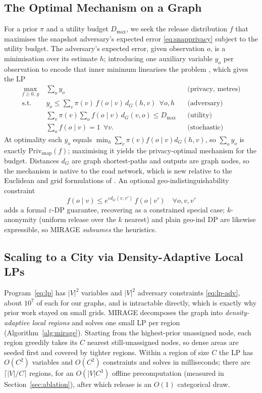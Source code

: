 \documentclass[10pt,journal,compsoc]{IEEEtran}
\newcommand{\dG}{d_{G}}
\begin{document}
\subsection{The Optimal Mechanism on a Graph}
For a prior $\pi$ and a utility budget $D_{\max}$, we seek the release distribution
$f$ that maximises the snapshot adversary's expected error \eqref{eq:snapprivacy}
subject to the utility budget. The adversary's expected error, given observation
$o$, is a minimisation over its estimate $h$; introducing one auxiliary variable
$y_o$ per observation to encode that inner minimum linearises the problem
\cite{shokri2012}, which gives the LP
\begin{subequations}\label{eq:lp}
\begin{align}
\max_{f\ge 0,\,y}\ & \sum_{o} y_o &&\text{(privacy, metres)}\\
\text{s.t. }\ & y_o \le \sum_{v}\pi(v)\,f(o\mid v)\,\dG(h,v)\ \ \forall o,h &&\text{(adversary)}\label{eq:lp-adv}\\
& \sum_{v}\pi(v)\sum_{o} f(o\mid v)\,\dG(v,o)\le D_{\max} &&\text{(utility)}\\
& \sum_{o} f(o\mid v)=1\ \ \forall v. &&\text{(stochastic)}
\end{align}
\end{subequations}
At optimality each $y_o$ equals $\min_h\sum_v \pi(v)f(o\mid v)\dG(h,v)$, so
$\sum_o y_o$ is exactly $\mathrm{Priv}_{\mathrm{snap}}(f)$; maximising it yields the
privacy-optimal mechanism for the budget. Distances $\dG$ are graph shortest-paths
and outputs are graph nodes, so the mechanism is native to the road network, which
is new relative to the Euclidean and grid formulations of
\cite{shokri2012,bordenabe2014}. An optional geo-indistinguishability constraint
\begin{equation}
f(o\mid v)\le e^{\varepsilon \dG(v,v')}\,f(o\mid v')\quad\forall o,v,v'
\label{eq:geoind}
\end{equation}
adds a formal $\varepsilon$-DP guarantee, recovering \cite{bordenabe2014} as a
constrained special case; $k$-anonymity (uniform release over the $k$ nearest) and
plain geo-ind DP are likewise expressible, so MIRAGE \emph{subsumes} the
heuristics.

\subsection{Scaling to a City via Density-Adaptive Local LPs}
Program~\eqref{eq:lp} has $|V|^2$ variables and $|V|^2$ adversary constraints
\eqref{eq:lp-adv}, about $10^7$ of each for our graphs, and is intractable
directly, which is exactly why prior work stayed on small grids. MIRAGE decomposes
the graph into \emph{density-adaptive local regions} and solves one small LP per
region (Algorithm~\ref{alg:mirage}). Starting from the highest-prior unassigned
node, each region greedily takes its $C$ nearest still-unassigned nodes, so dense
areas are seeded first and covered by tighter regions. Within a region of size $C$
the LP has $O(C^2)$ variables and $O(C^2)$ constraints and solves in milliseconds;
there are $\lceil|V|/C\rceil$ regions, for an $O(|V|C^3)$ offline precomputation
(measured in Section~\ref{sec:ablation}), after which release is an $O(1)$
categorical draw.
\end{document}
